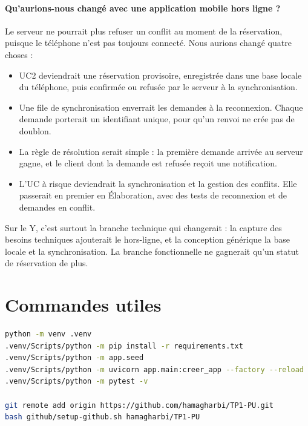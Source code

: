 \documentclass[11pt,a4paper]{article}
\begin{document}
\paragraph{Qu'aurions-nous changé avec une application mobile hors ligne ?}
Le serveur ne pourrait plus refuser un conflit au moment de la réservation, puisque
le téléphone n'est pas toujours connecté. Nous aurions changé quatre choses :
\begin{itemize}
  \item UC2 deviendrait une réservation provisoire, enregistrée dans une base locale
        du téléphone, puis confirmée ou refusée par le serveur à la synchronisation.
  \item Une file de synchronisation enverrait les demandes à la reconnexion. Chaque
        demande porterait un identifiant unique, pour qu'un renvoi ne crée pas de
        doublon.
  \item La règle de résolution serait simple : la première demande arrivée au
        serveur gagne, et le client dont la demande est refusée reçoit une
        notification.
  \item L'UC à risque deviendrait la synchronisation et la gestion des conflits.
        Elle passerait en premier en Élaboration, avec des tests de reconnexion et
        de demandes en conflit.
\end{itemize}
Sur le Y, c'est surtout la branche technique qui changerait : la capture des
besoins techniques ajouterait le hors-ligne, et la conception générique la base
locale et la synchronisation. La branche fonctionnelle ne gagnerait qu'un statut
de réservation de plus.

\appendix

\section{Commandes utiles}

\begin{lstlisting}[language=bash,numbers=none,caption={Installation, lancement, tests et publication sur GitHub}]
python -m venv .venv
.venv/Scripts/python -m pip install -r requirements.txt
.venv/Scripts/python -m app.seed
.venv/Scripts/python -m uvicorn app.main:creer_app --factory --reload
.venv/Scripts/python -m pytest -v

git remote add origin https://github.com/hamagharbi/TP1-PU.git
bash github/setup-github.sh hamagharbi/TP1-PU
\end{lstlisting}
\end{document}
